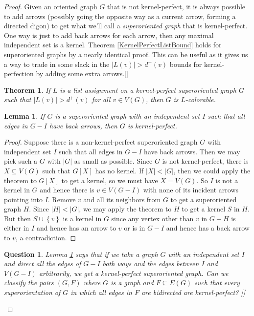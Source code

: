 \documentclass{amsbook}
\newcommand{\aaside}[2]{\marginnote{\scriptsize{#1}}[#2]}
\theoremstyle{plain}
\newtheorem{lemma}{Lemma}
\newtheorem{question}{Question}
\newtheorem{theorem}{Theorem}
\numberwithin{equation}{chapter}
\newcommand{\set}[1]{\left\{ #1 \right\}}
\newcommand{\card}[1]{\left|#1\right|}
\begin{document}
\begin{proof}
Given an oriented graph $G$ that is not kernel-perfect, it is always possible to add arrows (possibly going the opposite way as a current arrow, forming a directed digon) 
to get what we'll call a \emph{superoriented graph} that is kernel-perfect.  One way is just to add back arrows for each arrow, then any maximal independent set is a kernel.
Theorem \ref{KernelPerfectListBound} holds for superoriented graphs by a nearly identical proof.  
This can be useful as it gives us a way to trade in some slack in the $\card{L(v)} > d^+(v)$ bounds for kernel-perfection by adding some extra arrows.\aaside{\textcolor{blue}{example, picture}}{}

\begin{theorem}\label{KernelPerfectSuperListBound}
If $L$ is a list assignment on a kernel-perfect superoriented graph $G$ such that $\card{L(v)} > d^+(v)$ for all $v \in V(G)$, then $G$ is $L$-colorable.
\end{theorem}

\begin{lemma}\label{KostochkaYanceyKernelLemma}
If $G$ is a superoriented graph with an independent set $I$ such that all edges in $G-I$ have back arrows, then $G$ is kernel-perfect.
\end{lemma}
\begin{proof}
Suppose there is a non-kernel-perfect superoriented graph $G$ with independent set $I$ such that all edges in $G-I$ have back arrows.  Then we may pick such a $G$ with $\card{G}$
as small as possible.  Since $G$ is not kernel-perfect, there is $X \subseteq V(G)$ such that $G[X]$ has no kernel.  If $\card{X} < \card{G}$, 
then we could apply the theorem to $G[X]$ to get a kernel, so we must have $X = V(G)$.  So $I$ is not a kernel in $G$ and hence there is $v \in V(G-I)$ 
with none of its incident arrows pointing into $I$.  Remove $v$ and all its neighbors from $G$ to get a superoriented graph $H$. Since $\card{H} < \card{G}$, we may apply the
theorem to $H$ to get a kernel $S$ in $H$.  But then $S \cup \set{v}$ is a kernel in $G$ since any vertex other than $v$ in $G-H$ is either in $I$ and hence 
has an arrow to $v$ or is in $G-I$ and hence has a back arrow to $v$, a contradiction.
\end{proof}

\begin{question}
Lemma \ref{KostochkaYanceyKernelLemma} says that if we take a graph $G$ with an independent set $I$ and direct all the edges of $G-I$ both ways and the edges 
between $I$ and $V(G-I)$ arbitrarily, we get a kernel-perfect superoriented graph.  Can we classify the pairs $(G, F)$ where $G$ is a graph and $F \subseteq E(G)$ such that
every superorientation of $G$ in which all edges in $F$ are bidirected are kernel-perfect?  \aaside{\textcolor{blue}{examples}}{}
\end{question}


\end{proof}
\end{document}
